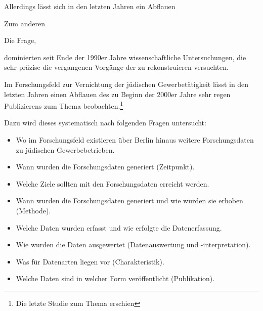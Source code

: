 {Allerdings lässt sich in den letzten Jahren ein Abflauen

Zum anderen

Die Frage, 

 dominierten seit Ende der 1990er Jahre wissenschaftliche Untersuchungen, die sehr präzise die vergangenen Vorgänge der zu rekonstruieren versuchten.      


Im Forschungsfeld zur Vernichtung der jüdischen Gewerbetätigkeit lässt in den letzten Jahren einen Abflauen des zu Beginn der 2000er Jahre sehr regen Publizierens zum Thema beobachten.\footnote{Die letzte Studie zum Thema erschien}


Dazu wird dieses systematisch nach folgenden Fragen untersucht:

\begin{itemize}
\item Wo im Forschungsfeld existieren über Berlin hinaus weitere Forschungsdaten zu jüdischen Gewerbebetrieben.
\item Wann wurden die Forschungsdaten generiert (Zeitpunkt).
\item Welche Ziele sollten mit den Forschungsdaten erreicht werden.
\item Wann wurden die Forschungsdaten generiert und wie wurden sie erhoben (Methode). 
\item Welche Daten wurden erfasst und wie erfolgte die Datenerfassung.
\item Wie wurden die Daten ausgewertet (Datenauswertung und -interpretation).
\item Was für Datenarten liegen vor (Charakteristik).
\item Welche Daten sind in welcher Form veröffentlicht (Publikation).
\end{itemize}


}
